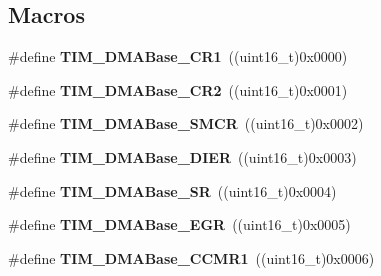 \subsection*{Macros}
\begin{DoxyCompactItemize}
\item 
\mbox{\label{group___t_i_m___d_m_a___base__address_ga73bca5b14da2d5026fa3877d0db53740}} 
\#define {\bfseries T\+I\+M\+\_\+\+D\+M\+A\+Base\+\_\+\+C\+R1}~((uint16\+\_\+t)0x0000)
\item 
\mbox{\label{group___t_i_m___d_m_a___base__address_ga50e894f0d2cecc1ff3a3578098c3246e}} 
\#define {\bfseries T\+I\+M\+\_\+\+D\+M\+A\+Base\+\_\+\+C\+R2}~((uint16\+\_\+t)0x0001)
\item 
\mbox{\label{group___t_i_m___d_m_a___base__address_ga748e24ac0675caa55869d6ba506448df}} 
\#define {\bfseries T\+I\+M\+\_\+\+D\+M\+A\+Base\+\_\+\+S\+M\+CR}~((uint16\+\_\+t)0x0002)
\item 
\mbox{\label{group___t_i_m___d_m_a___base__address_gaeddacbbc2adf9705feac250f077d8c93}} 
\#define {\bfseries T\+I\+M\+\_\+\+D\+M\+A\+Base\+\_\+\+D\+I\+ER}~((uint16\+\_\+t)0x0003)
\item 
\mbox{\label{group___t_i_m___d_m_a___base__address_ga5cda07a11a76bbb24a7d5bb680814d31}} 
\#define {\bfseries T\+I\+M\+\_\+\+D\+M\+A\+Base\+\_\+\+SR}~((uint16\+\_\+t)0x0004)
\item 
\mbox{\label{group___t_i_m___d_m_a___base__address_gab5e6f6c3fea100896d13ce317a6ccd8e}} 
\#define {\bfseries T\+I\+M\+\_\+\+D\+M\+A\+Base\+\_\+\+E\+GR}~((uint16\+\_\+t)0x0005)
\item 
\mbox{\label{group___t_i_m___d_m_a___base__address_gaab384496cff3e54d8179fc0db727c7ee}} 
\#define {\bfseries T\+I\+M\+\_\+\+D\+M\+A\+Base\+\_\+\+C\+C\+M\+R1}~((uint16\+\_\+t)0x0006)
\item 
\mbox{\label{group___t_i_m___d_m_a___base__address_ga4989f74592ab359f30bd7c4a4a457571}} 

\end{DoxyCompactItemize}

